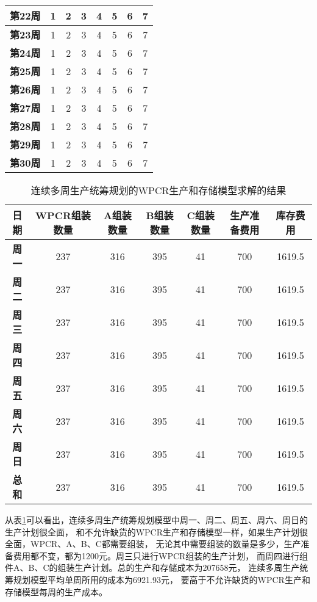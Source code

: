 \begin{table}[H]
\begin{tabular}{|c|c|c|c|c|c|c|c|}
    \textbf{第22周}  & 1 & 2 & 3 & 4 & 5 & 6 & 7 \\ \hline
    \textbf{第23周}  & 1 & 2 & 3 & 4 & 5 & 6 & 7 \\ \hline
    \textbf{第24周}  & 1 & 2 & 3 & 4 & 5 & 6 & 7 \\ \hline
    \textbf{第25周}  & 1 & 2 & 3 & 4 & 5 & 6 & 7 \\ \hline
    \textbf{第26周}  & 1 & 2 & 3 & 4 & 5 & 6 & 7 \\ \hline
    \textbf{第27周}  & 1 & 2 & 3 & 4 & 5 & 6 & 7 \\ \hline
    \textbf{第28周}  & 1 & 2 & 3 & 4 & 5 & 6 & 7 \\ \hline
    \textbf{第29周}  & 1 & 2 & 3 & 4 & 5 & 6 & 7 \\ \hline
    \textbf{第30周}  & 1 & 2 & 3 & 4 & 5 & 6 & 7 \\ \hline
    \end{tabular}
\end{table}

\begin{table}[H]
    \centering
    \renewcommand\arraystretch{1.5} 
    \caption{连续多周生产统筹规划的WPCR生产和存储模型求解的结果}
    \xiaowu
    \label{T.ch3-2}
    \begin{tabular}{|c|c|c|c|c|c|c|}
        \hline
        \textbf{日期} & \textbf{WPCR组装数量} & \textbf{A组装数量} & \textbf{B组装数量} & \textbf{C组装数量} & \textbf{生产准备费用} & \textbf{库存费用} \\ \hline
        \textbf{周一} & 237 & 316 & 395 & 41 & 700 & 1619.5 \\ \hline
        \textbf{周二} & 237 & 316 & 395 & 41 & 700 & 1619.5 \\ \hline
        \textbf{周三} & 237 & 316 & 395 & 41 & 700 & 1619.5 \\ \hline
        \textbf{周四} & 237 & 316 & 395 & 41 & 700 & 1619.5 \\ \hline
        \textbf{周五} & 237 & 316 & 395 & 41 & 700 & 1619.5 \\ \hline
        \textbf{周六} & 237 & 316 & 395 & 41 & 700 & 1619.5 \\ \hline
        \textbf{周日} & 237 & 316 & 395 & 41 & 700 & 1619.5 \\ \hline
        \textbf{总和} & 237 & 316 & 395 & 41 & 700 & 1619.5 \\ \hline 
    \end{tabular}
\end{table}

从表\ref{T.ch3-2}可以看出，连续多周生产统筹规划模型中周一、周二、周五、周六、周日的生产计划很全面，
和不允许缺货的WPCR生产和存储模型一样，如果生产计划很全面，WPCR、A、B、C都需要组装，
无论其中需要组装的数量是多少，生产准备费用都不变，都为1200元。周三只进行WPCR组装的生产计划，
而周四进行组件A、B、C的组装生产计划。总的生产和存储成本为207658元，
连续多周生产统筹规划模型平均单周所用的成本为6921.93元，
要高于不允许缺货的WPCR生产和存储模型每周的生产成本。